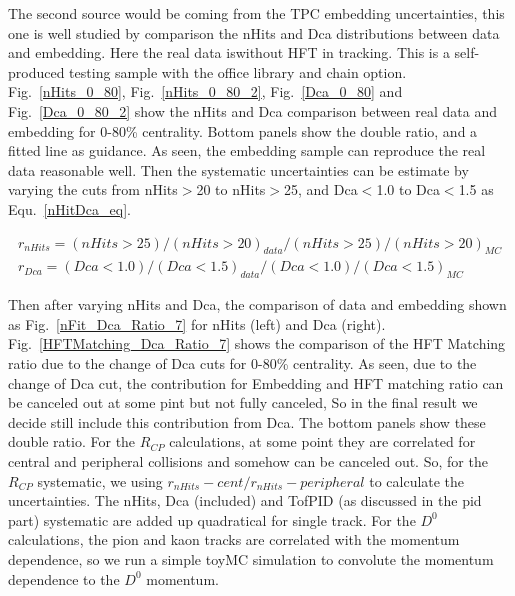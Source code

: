 The second source would be coming from the TPC embedding uncertainties, this one is well studied by comparison the nHits and Dca distributions between data and embedding. Here the real data iswithout HFT in tracking. This is a self-produced testing sample with the office library and chain option. Fig.~\ref{nHits_0_80}, Fig.~\ref{nHits_0_80_2}, Fig.~\ref{Dca_0_80} and Fig.~\ref{Dca_0_80_2} show the nHits and Dca comparison between real data and embedding for 0-80\% centrality. Bottom panels show the double ratio, and a fitted line as guidance. As seen, the embedding sample can reproduce the real data reasonable well. Then the systematic uncertainties can be estimate by varying the cuts from nHits$>$20 to nHits$>$25, and Dca$<$1.0 to Dca$<$1.5 as Equ.~\ref{nHitDca_eq}. 

\begin{equation}
  \begin{aligned}
  r_{nHits} = (nHits>25)/(nHits>20)_{data} / (nHits>25)/(nHits>20)_{MC} \\
  r_{Dca} = (Dca<1.0)/(Dca<1.5)_{data} / (Dca<1.0)/(Dca<1.5)_{MC}
\end{aligned}
\label{nHitDca_eq}
\end{equation}

Then after varying nHits and Dca, the comparison of data and embedding shown as Fig.~\ref{nFit_Dca_Ratio_7} for nHits (left) and Dca (right). Fig.~\ref{HFTMatching_Dca_Ratio_7} shows the comparison of the HFT Matching ratio due to the change of Dca cuts for 0-80\% centrality. As seen, due to the change of Dca cut, the contribution for Embedding and HFT matching ratio can be canceled out at some pint but not fully canceled, So in the final result we decide still  include this contribution from Dca. The bottom panels show these double ratio. For the $R_{CP}$ calculations, at some point they are correlated for central and peripheral collisions and somehow can be canceled out. So, for the $R_{CP}$ systematic, we using $r_{nHits}-cent / r_{nHits}-peripheral$ to calculate the uncertainties. The nHits, Dca (included) and TofPID (as discussed in the pid part) systematic are added up quadratical for single track. For the $D^0$ calculations, the pion and kaon tracks are correlated with the momentum dependence, so we run a simple toyMC simulation to convolute the momentum dependence to the $D^0$ momentum.

